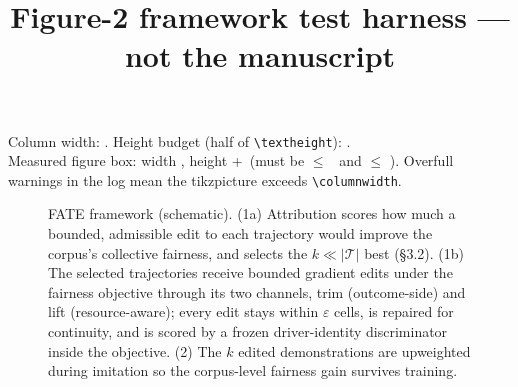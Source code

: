 \documentclass[sigconf,review,anonymous]{acmart}
\begin{document}
\title{Figure-2 framework test harness --- not the manuscript}
\maketitle

\newsavebox{\figbox}
\sbox{\figbox}{}

\noindent Column width: \the\columnwidth. Height budget (half of
\verb|\textheight|): \the{}\textheight\relax.\\
Measured figure box: width \the\wd\figbox, height
\the\dimexpr\ht\figbox+\dp\figbox\relax\ (must be
$\le$ \the\columnwidth\ and $\le$ \the{}\textheight\relax).
Overfull warnings in the log mean the tikzpicture exceeds
\verb|\columnwidth|.

\begin{figure}[h]
  \centering
  \usebox{\figbox}
  \caption{FATE framework (schematic). (1a) Attribution scores how much a
  bounded, admissible edit to each trajectory would improve the corpus's
  collective fairness, and selects the $k \ll |\mathcal{T}|$ best (\S3.2).
  (1b) The selected trajectories receive bounded
  gradient edits under the fairness objective through its two channels, trim
  (outcome-side) and lift (resource-aware); every edit stays within
  $\varepsilon$ cells, is repaired for continuity, and is scored by a frozen
  driver-identity discriminator inside the objective. (2) The $k$ edited
  demonstrations are upweighted during imitation so the corpus-level fairness
  gain survives training.}
\end{figure}
\end{document}
